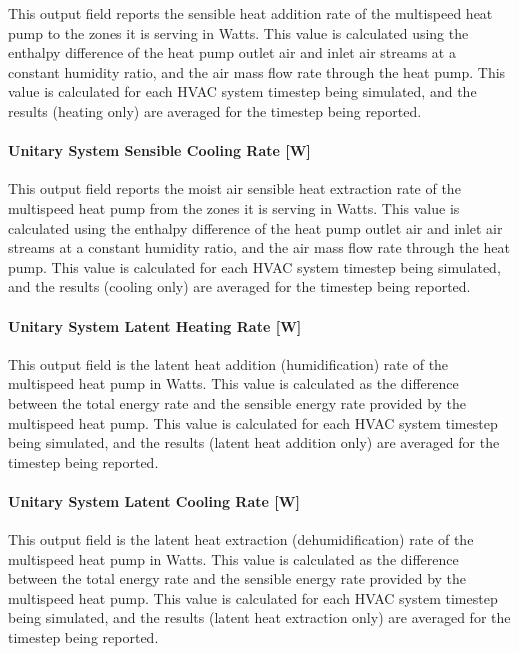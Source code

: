 This output field reports the sensible heat addition rate of the multispeed heat pump to the zones it is serving in Watts. This value is calculated using the enthalpy difference of the heat pump outlet air and inlet air streams at a constant humidity ratio, and the air mass flow rate through the heat pump. This value is calculated for each HVAC system timestep being simulated, and the results (heating only) are averaged for the timestep being reported.

\paragraph{Unitary System Sensible Cooling Rate {[}W{]}}\label{unitary-system-sensible-cooling-rate-w-1}

This output field reports the moist air sensible heat extraction rate of the multispeed heat pump from the zones it is serving in Watts. This value is calculated using the enthalpy difference of the heat pump outlet air and inlet air streams at a constant humidity ratio, and the air mass flow rate through the heat pump. This value is calculated for each HVAC system timestep being simulated, and the results (cooling only) are averaged for the timestep being reported.

\paragraph{Unitary System Latent Heating Rate {[}W{]}}\label{unitary-system-latent-heating-rate-w-1}

This output field is the latent heat addition (humidification) rate of the multispeed heat pump in Watts. This value is calculated as the difference between the total energy rate and the sensible energy rate provided by the multispeed heat pump. This value is calculated for each HVAC system timestep being simulated, and the results (latent heat addition only) are averaged for the timestep being reported.

\paragraph{Unitary System Latent Cooling Rate {[}W{]}}\label{unitary-system-latent-cooling-rate-w-1}

This output field is the latent heat extraction (dehumidification) rate of the multispeed heat pump in Watts. This value is calculated as the difference between the total energy rate and the sensible energy rate provided by the multispeed heat pump. This value is calculated for each HVAC system timestep being simulated, and the results (latent heat extraction only) are averaged for the timestep being reported.

